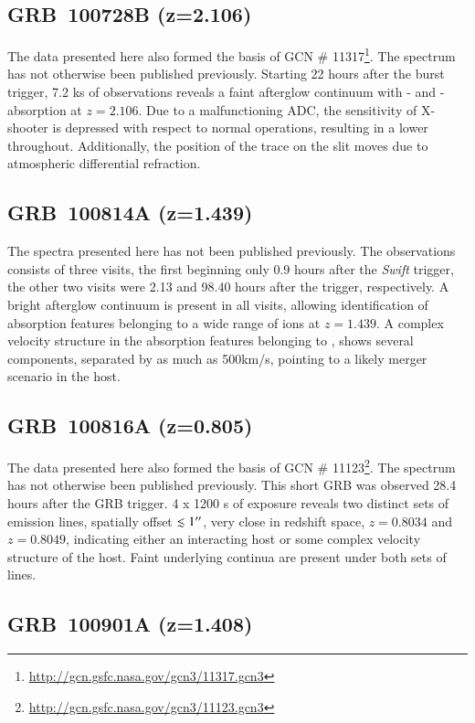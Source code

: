 \documentclass{aa}    %
\begin{document}
\subsection{GRB~100728B (z=2.106)}

The data presented here also formed the basis of GCN \#
11317\footnote{\url{http://gcn.gsfc.nasa.gov/gcn3/11317.gcn3}}. The spectrum has
not otherwise been published previously. Starting 22 hours after the burst
trigger, 7.2 ks of observations reveals a faint afterglow continuum with \lya-
and \mgii-absorption at $z=2.106$. Due to a malfunctioning ADC, the sensitivity
of X-shooter is depressed with respect to normal operations, resulting in a
lower throughout. Additionally, the position of the trace on the slit moves due
to atmospheric differential refraction.

\subsection{GRB~100814A (z=1.439)}

The spectra presented here has not been published previously. The observations
consists of three visits, the first beginning only 0.9 hours after the
\textit{Swift} trigger, the other two visits were 2.13 and 98.40 hours after the
trigger, respectively. A bright afterglow continuum is present in all visits,
allowing identification of absorption features belonging to a wide range of ions
at $z=1.439$. A complex velocity structure in the absorption features belonging
to \mgii, shows several components, separated by as much as 500km/s, pointing to
a likely merger scenario in the host.

\subsection{GRB~100816A (z=0.805)}

The data presented here also formed the basis of GCN \#
11123\footnote{\url{http://gcn.gsfc.nasa.gov/gcn3/11123.gcn3}}. The spectrum has
not otherwise been published previously. This short GRB was observed 28.4 hours
after the GRB trigger. 4 x 1200 s of exposure reveals two distinct sets of
emission lines, spatially offset $\lesssim 1 ^{\prime\prime} $, very close in redshift
space, $z=0.8034$ and $z=0.8049$, indicating either an interacting host or some
complex velocity structure of the host. Faint underlying continua are present
under both sets of lines.

\subsection{GRB~100901A (z=1.408)}
\end{document}
